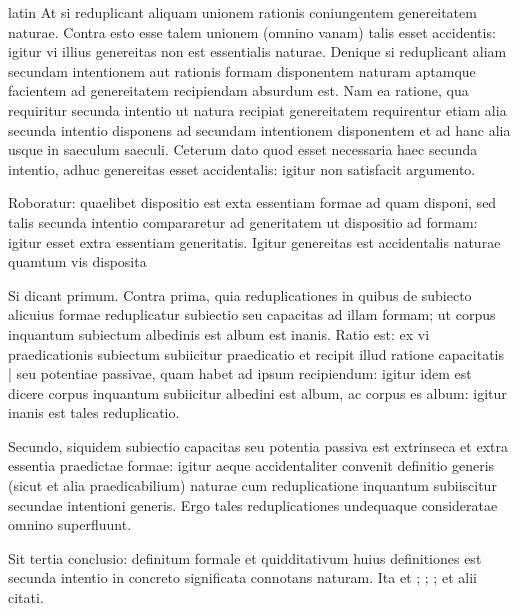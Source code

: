 \begin{otherlanguage*}{latin}
\pstart
  At si reduplicant aliquam unionem rationis coniungentem genereitatem naturae. Contra esto esse talem unionem (omnino vanam) talis esset accidentis: igitur vi illius genereitas non est essentialis naturae. Denique si reduplicant aliam secundam intentionem aut rationis formam disponentem naturam aptamque facientem ad genereitatem recipiendam absurdum est. Nam ea ratione, qua requiritur secunda intentio ut natura recipiat genereitatem requirentur etiam alia secunda intentio disponens ad secundam intentionem disponentem et ad hanc alia usque in saeculum saeculi. Ceterum dato quod esset necessaria haec secunda intentio, adhuc genereitas esset accidentalis: igitur non satisfacit argumento. 
\pend

\pstart
  Roboratur: quaelibet dispositio est exta essentiam formae ad quam disponi, sed talis secunda intentio compararetur ad generitatem ut dispositio ad formam: igitur esset extra essentiam generitatis. Igitur genereitas est accidentalis naturae quamtum vis disposita 
\pend

\pstart
  Si dicant primum. Contra prima, quia reduplicationes in quibus de subiecto alicuius formae reduplicatur subiectio seu capacitas ad illam formam; ut corpus inquantum subiectum albedinis est album est inanis. Ratio est: ex vi praedicationis subiectum subiicitur praedicatio et recipit illud ratione capacitatis \textnormal{|}   seu potentiae passivae, quam habet ad ipsum recipiendum: igitur idem est dicere corpus inquantum subiicitur albedini est album, ac corpus es album: igitur inanis est tales reduplicatio. 
\pend

\pstart
  Secundo, siquidem subiectio capacitas seu potentia passiva est extrinseca et extra essentia praedictae formae: igitur aeque accidentaliter convenit definitio generis (sicut et alia praedicabilium) naturae cum reduplicatione inquantum subiiscitur secundae intentioni generis. Ergo tales reduplicationes undequaque consideratae omnino superfluunt. 
\pend

\pstart
  Sit tertia conclusio: definitum formale et quidditativum huius definitiones est secunda intentio in concreto significata connotans naturam. Ita  et ; ; ;  et alii citati. 
\pend


\end{otherlanguage*}
